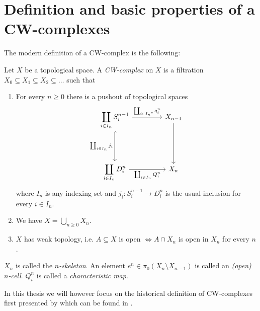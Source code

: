 \section{Definition and basic properties of a CW-complexes}

The modern definition of a CW-complex is the following:

\begin{defi}\label{defi:CWComplex1}
    Let $X$ be a topological space.
    A \emph{CW-complex} on $X$ is a filtration
    $X_0 \subseteq X_1 \subseteq X_2 \subseteq \dots$ such that
    \begin{enumerate}
        \item For every $n \ge 0$ there is a pushout of topological spaces
            \[
            \begin{tikzcd}[row sep = 1.5cm, column sep = 1.5cm]
                \displaystyle \coprod_{i \in I_n}S_i^{n - 1} \arrow[r, "\coprod_{i \in I_n"}q_i^n"] \arrow[d, hook, "\coprod_{i \in I_n} j_i"'] & X_{n- 1} \arrow[d] \\
                \displaystyle \coprod_{i \in I_n}D_i^n \arrow[r, "\coprod_{i \in I_n} Q_i^n"'] & X_n
            \end{tikzcd}
            \]
            where $I_n$ is any indexing set and $j_i \colon S_i^{n - 1} \to D_i^n$ is the usual inclusion for every $i \in I_n$.
        \item We have $X = \bigcup_{n \ge 0} X_n$.
        \item $X$ has weak topology, i.e. $A \subseteq X$ is open $\iff A \cap X_n$ is open in $X_n$ for every $n$.
    \end{enumerate}
    $X_n$ is called the \emph{$n$-skeleton}.
    An element $e^n \in \pi_0 (X_n \setminus X_{n - 1})$ is called an \emph{(open) $n$-cell}.
    $Q_i^n$ is called a \emph{characteristic map}.
\end{defi}


In this thesis we will however focus on the historical definition of CW-complexes first presented by  which can be found in \cite{Whitehead2018}.

